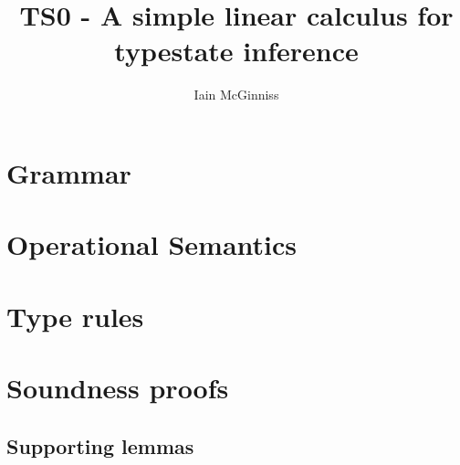 \documentclass{article}
\begin{document}
\title{TS0 - A simple linear calculus for typestate inference}
\author{Iain McGinniss}

\section{Grammar}

\ottgrammartabular{
\ottt\ottinterrule
\ottv\ottinterrule
\otto\ottinterrule
\ottsv\ottinterrule
\ottT\ottinterrule
\ottst\ottinterrule
\ottO\ottinterrule
}

\section{Operational Semantics}

\ottgrammartabular{
\ottmu\ottinterrule
}

\ottdefnvalidstore

\ottdefnreduce

\section{Type rules}
\label{sec:typerules}

\ottgrammartabular{
\ottG\ottinterrule
\ottT\ottinterrule
}

\ottdefnvalidgamma

\ottdefnstoretype

\ottdefnmethtype

\ottdefntype

\section{Soundness proofs}

\subsection{Supporting lemmas}
\end{document}
